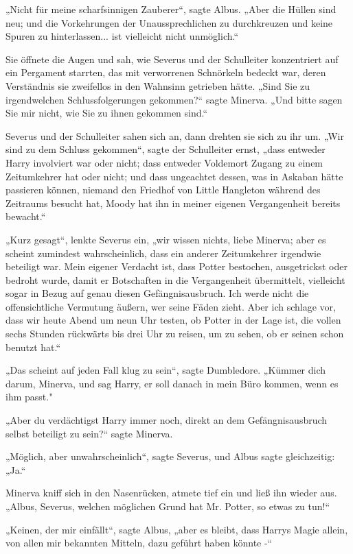 {„Nicht für meine scharfsinnigen Zauberer“, sagte Albus. „Aber die Hüllen sind neu; und die Vorkehrungen der Unaussprechlichen zu durchkreuzen und keine Spuren zu hinterlassen... ist vielleicht nicht unmöglich.“

Sie öffnete die Augen und sah, wie Severus und der Schulleiter konzentriert auf ein Pergament starrten, das mit verworrenen Schnörkeln bedeckt war, deren Verständnis sie zweifellos in den Wahnsinn getrieben hätte. „Sind Sie zu irgendwelchen Schlussfolgerungen gekommen?“ sagte Minerva. „Und bitte sagen Sie mir nicht, wie Sie zu ihnen gekommen sind.“

Severus und der Schulleiter sahen sich an, dann drehten sie sich zu ihr um. „Wir sind zu dem Schluss gekommen“, sagte der Schulleiter ernst, „dass entweder Harry involviert war oder nicht; dass entweder Voldemort Zugang zu einem Zeitumkehrer hat oder nicht; und dass ungeachtet dessen, was in Askaban hätte passieren können, niemand den Friedhof von Little Hangleton während des Zeitraums besucht hat, Moody hat ihn in meiner eigenen Vergangenheit bereits bewacht.“

„Kurz gesagt“, lenkte Severus ein, „wir wissen nichts, liebe Minerva; aber es scheint zumindest wahrscheinlich, dass ein anderer Zeitumkehrer irgendwie beteiligt war. Mein eigener Verdacht ist, dass Potter bestochen, ausgetrickst oder bedroht wurde, damit er Botschaften in die Vergangenheit übermittelt, vielleicht sogar in Bezug auf genau diesen Gefängnisausbruch. Ich werde nicht die offensichtliche Vermutung äußern, wer seine Fäden zieht. Aber ich schlage vor, dass wir heute Abend um neun Uhr testen, ob Potter in der Lage ist, die vollen sechs Stunden rückwärts bis drei Uhr zu reisen, um zu sehen, ob er seinen schon benutzt hat.“

„Das scheint auf jeden Fall klug zu sein“, sagte Dumbledore. „Kümmer dich darum, Minerva, und sag Harry, er soll danach in mein Büro kommen, wenn es ihm passt."

„Aber du verdächtigst Harry immer noch, direkt an dem Gefängnisausbruch selbst beteiligt zu sein?“ sagte Minerva.

„Möglich, aber unwahrscheinlich“, sagte Severus, und Albus sagte gleichzeitig: „Ja.“

Minerva kniff sich in den Nasenrücken, atmete tief ein und ließ ihn wieder aus. „Albus, Severus, welchen möglichen Grund hat Mr. Potter, so etwas zu tun!“

„Keinen, der mir einfällt“, sagte Albus, „aber es bleibt, dass Harrys Magie allein, von allen mir bekannten Mitteln, dazu geführt haben könnte -“

}
